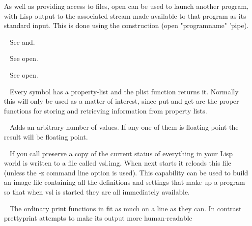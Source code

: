 \begin{description}
As well as providing access to files, {\tx open} can be used to launch
another program, with Lisp output to the associated stream made available to
that program as its standard input. This is done using the
construction {\tx (open "programname" 'pipe)}.
\item[{\tx or~~~~~~~~~~~} \hspace{1cm} {\em special form}]~\newline
See {\tx and}.
\item[{\tx output~~~~~~~} \hspace{1cm} {\em symbol}]~\newline
See {\tx open}.
\item[{\tx pipe~~~~~~~~~} \hspace{1cm} {\em symbol}]~\newline
See {\tx open}.
\item[{\tx plist~~~~~~~~} \hspace{1cm} {\em function 1 arg}]~\newline
Every symbol has a property-list and the {\tx plist} function returns it. Normally
this will only be used as a matter of interest, since {\tx put} and {\tx get}
are the proper functions for storing and retrieving information from property
lists.
\item[{\tx plus~~~~~~~~~} \hspace{1cm} {\em special form}]~\newline
Adds an arbitrary number of values. If any one of them is floating
point the result will be floating point.
\item[{\tx preserve~~~~~} \hspace{1cm} {\em function 0 or 1 arg}]~\newline
If you call {\tx preserve} a copy of the current status of everything in your
Lisp world is written to a file called {\tx vsl.img}. When \vsl{} next starts
it reloads this file (unless the {\tx -z} command line option is used). This
capability can be used to build an image file containing all the definitions
and settings that make up a program so that when {\tx vsl} is started
they are all immediately available.
\item[{\tx prettyprint~~} \hspace{1cm} {\em function 1 arg}]~\newline
The ordinary print functions in \vsl{} fit as much on a line as they can. In
contrast {\tx prettyprint} attempts to make its output more human-readable

\end{description}
